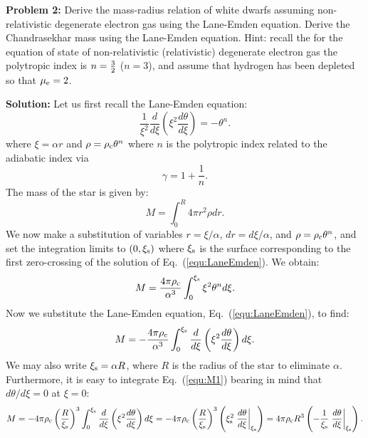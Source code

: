 \documentclass[12pt]{article}
\def\rhoc{\textcolor{red}{\rho}}
\def\xis{\xi_{\rm s}}
\def\rhoc{\rho_{\rm c}}
\begin{document}
{\bf Problem 2:} Derive the mass-radius relation of white dwarfs
assuming non-relativistic degenerate electron gas using the Lane-Emden
equation. Derive the Chandrasekhar mass using the Lane-Emden
equation. Hint: recall the for the equation of state of
non-relativistic (relativistic) degenerate electron gas the polytropic
index is $n={3 \over 2}$ ($n=3$), and assume that hydrogen has been
depleted so that $\mu_{\rm e} = 2$.

{\bf Solution:} Let us first recall the Lane-Emden equation:
\begin{equation}
\frac{1}{\xi^2} \frac{d}{d\xi} \left(\xi^2 \frac{d\theta}{d\xi} \right) = -\theta^n.\label{equ:LaneEmden}
\end{equation}
where $\xi = \alpha r$ and $\rho = \rhoc \theta^n$ where $n$ is the
polytropic index related to the adiabatic index via
\begin{equation}
\gamma = 1 + \frac{1}{n}.
\end{equation}
The mass of the star is given by:
\begin{equation}
M = \int_0^R 4\pi r^2 \rho dr.
\end{equation}
We now make a substitution of variables $r = \xi/\alpha$, $dr =
d\xi/\alpha$, and $\rho = \rhoc \theta^n$, and set the integration
limits to $(0,\xis)$ where $\xis$ is the surface corresponding to the
first zero-crossing of the solution of Eq.~(\ref{equ:LaneEmden}). We
obtain:
\begin{equation}
M = \frac{4\pi \rhoc}{\alpha^3} \int_0^{\xis} \xi^2 \theta^n d\xi.
\end{equation}
Now we substitute the Lane-Emden equation, Eq.~(\ref{equ:LaneEmden}),
to find:
\begin{equation}
M = -\frac{4\pi \rhoc}{\alpha^3} \int_0^{\xis} \frac{d}{d\xi} \left(\xi^2 \frac{d\theta}{d\xi} \right) d\xi.\label{equ:M1}
\end{equation}
We may also write $\xis = \alpha R$, where $R$ is the radius of the
star to eliminate $\alpha$. Furthermore, it is easy to integrate
Eq.~(\ref{equ:M1}) bearing in mind that $d\theta/d\xi =0$ at $\xi=0$:
\begin{equation}
M = -4\pi \rhoc \left(\frac{R}{\xis}\right)^3 \int_0^{\xis} \frac{d}{d\xi} \left(\xi^2 \frac{d\theta}{d\xi} \right) d\xi = -4\pi \rhoc \left(\frac{R}{\xis}\right)^3 \left(\xis^2 \left.\frac{d\theta}{d\xi}\right|_{\xis} \right) = 4\pi \rhoc R^3 \left(- \frac{1}{\xis} \left.\frac{d\theta}{d\xi}\right|_{\xis} \right).\label{equ:M2}
\end{equation}
\end{document}
